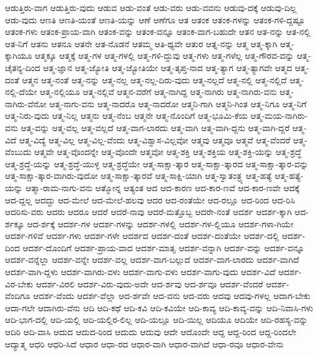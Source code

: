{ಆಡುತ್ತಿರು-ವಾಗ
ಆಡುತ್ತಿರು-ವುದು
ಆಡುವ
ಆಡು-ವಂತೆ
ಆಡು-ವರು
ಆಡು-ವವನು
ಆಡುವು-ದಕ್ಕೆ
ಆಡುವು-ದಿಲ್ಲ
ಆಡು-ವುದು
ಆಣತಿ
ಆಣತಿ-ಯಂತೆ
ಆಣತಿ-ಯನ್ನು
ಆಣೆ
ಆಣೆಗೂ
ಆತ
ಆತಂಕ
ಆತಂಕ-ಗಳನ್ನು
ಆತಂಕ-ಗಳಿ-ದ್ದಷ್ಟೂ
ಆತಂಕ-ಗಳು
ಆತಂಕ-ಪ್ರಾಯ-ವಾಗಿ
ಆತಂಕ-ವನ್ನು
ಆತಂಕ-ವನ್ನೂ
ಆತಂಕ-ವಾಗ-ಬಹುದೇ
ಆತನ
ಆತ-ನನ್ನು
ಆತ-ನಲ್ಲಿ
ಆತ-ನಿಗೆ
ಆತನು
ಆತನೂ
ಆತನೇ
ಆತ-ನೊಡನೆ
ಆತಮ್ಮ
ಆತಿ-ಥ್ಯವೇ
ಆತುರ
ಆತ್ನ-ನನ್ನು
ಆತ್ಮ
ಆತ್ಮ-ಕ್ಕಾಗಿ
ಆತ್ಮ-ಕ್ಕಾಗಿಯೂ
ಆತ್ಮಕ್ಕೂ
ಆತ್ಮಕ್ಕೆ
ಆತ್ಮ-ಗಳ
ಆತ್ಮ-ಗಳಲ್ಲಿ
ಆತ್ಮ-ಗಳಿ-ದ್ದುವು
ಆತ್ಮ-ಗಳು
ಆತ್ಮ-ಗಳೆಲ್ಲ
ಆತ್ಮ-ಗೌರವ-ವನ್ನು
ಆತ್ಮ-ಚೈತನ್ಯ-ದಿಂದ
ಆತ್ಮ-ಜ್ಞಾನ
ಆತ್ಮ-ಜ್ಯೋತಿ
ಆತ್ಮ-ಜ್ಯೋತಿಯೇ
ಆತ್ಮ-ತೃಪ್ತ-ನಾದ
ಆತ್ಮ-ತ್ಯಾಗ
ಆತ್ಮ-ತ್ಯಾಗವೇ
ಆತ್ಮದ
ಆತ್ಮ-ದಂತೆ
ಆತ್ಮನ
ಆತ್ಮ-ನಂತೆ
ಆತ್ಮ-ನನ್ನು
ಆತ್ಮ-ನಲ್ಲ
ಆತ್ಮ-ನಲ್ಲ-ದಿರು-ವುದು
ಆತ್ಮ-ನಲ್ಲದೆ
ಆತ್ಮ-ನಲ್ಲಿ
ಆತ್ಮ-ನಲ್ಲಿದೆ
ಆತ್ಮ-ನಲ್ಲಿ-ದೆಯೇ
ಆತ್ಮ-ನಲ್ಲಿಯೂ
ಆತ್ಮ-ನಲ್ಲಿವೆ
ಆತ್ಮನ-ವರೆಗೆ
ಆತ್ಮ-ನಾಗಿದ್ದ
ಆತ್ಮ-ನಾಗಿರು
ಆತ್ಮ-ನಾಗಿರು-ವನು
ಆತ್ಮ-ನಾಗಿರು-ವೆನೋ
ಆತ್ಮ-ನಾಗು-ವನು
ಆತ್ಮ-ನಾದರೊ
ಆತ್ಮ-ನಾದರೋ
ಆತ್ಮನಿ-ಗಾಗಿ
ಆತ್ಮನಿ-ಗಿಂತ
ಆತ್ಮ-ನಿಗೂ
ಆತ್ಮ-ನಿಗೆ
ಆತ್ಮ-ನಿರು-ವುದು
ಆತ್ಮ-ನಿಲ್ಲ
ಆತ್ಮನು
ಆತ್ಮ-ನೆಂಬ
ಆತ್ಮನೇ
ಆತ್ಮ-ನೊಂದಿಗೆ
ಆತ್ಮ-ಭೂಮಿ-ಕೆಯ
ಆತ್ಮ-ಮಯ-ನಾಗಿರು-ವನು
ಆತ್ಮ-ವನ್ನು
ಆತ್ಮ-ವಲ್ಲ
ಆತ್ಮ-ವಲ್ಲದೆ
ಆತ್ಮ-ವಾಗ-ಲಾರದು
ಆತ್ಮ-ವಾಗಿ
ಆತ್ಮ-ವಾಗಿ-ದ್ದನು
ಆತ್ಮ-ವಾಗಿ-ದ್ದರೆ
ಆತ್ಮ-ವಿದೆ
ಆತ್ಮ-ವಿದ್ಯೆ
ಆತ್ಮ-ವಿಲ್ಲ
ಆತ್ಮ-ವಿಲ್ಲ-ವೆಂದು
ಆತ್ಮ-ವಿಶ್ವಾಸ-ವಿಲ್ಲವೋ
ಆತ್ಮವು
ಆತ್ಮವೂ
ಆತ್ಮವೆ
ಆತ್ಮ-ವೆಂದರೆ
ಆತ್ಮ-ವೆಂಬುದು
ಆತ್ಮವೇ
ಆತ್ಮ-ವೊಂದನ್ನೇ
ಆತ್ಮ-ವೊಂದೇ
ಆತ್ಮವೋ
ಆತ್ಮ-ಶಕ್ತಿ
ಆತ್ಮ-ಶಕ್ತಿಯ
ಆತ್ಮ-ಶಕ್ತಿ-ಯನ್ನು
ಆತ್ಮ-ಶ್ರದ್ಧೆ
ಆತ್ಮ-ಶ್ರದ್ಧೆ-ಯನ್ನು
ಆತ್ಮ-ಶ್ರದ್ಧೆ-ಯುಳ್ಳ
ಆತ್ಮ-ಶ್ರದ್ಧೆಯೇ
ಆತ್ಮ-ಸಾಕ್ಷಾ-ತ್ಕಾರ
ಆತ್ಮ-ಸಾಕ್ಷಾ-ತ್ಕಾರದ
ಆತ್ಮ-ಸಾಕ್ಷಾ-ತ್ಕಾರ-ವನ್ನು
ಆತ್ಮ-ಸಾಕ್ಷಾ-ತ್ಕಾರ-ವಾಗಿರು-ವುದೋ
ಆತ್ಮ-ಸಾಕ್ಷಾ-ತ್ಕಾರವೆ
ಆತ್ಮ-ಸಾಕ್ಷಿ-ಯಾಗಿ
ಆತ್ಮ-ಸ್ವಾತಂತ್ರ್ಯ
ಆತ್ಮ-ಹತ್ಯೆ
ಆತ್ಮ-ಹತ್ಯೆ-ಯನ್ನು
ಆತ್ಮಾ-ರಾಮ-ನಾಗು-ವನು
ಆತ್ಮೋನ್ನ
ಆತ್ಯಂತ
ಆದ
ಆದ-ಕಾರಣ
ಆದ-ಕಾರ-ಣವೆ
ಆದ-ಕಾರ-ಣವೇ
ಆದಕ್ಕೆ
ಆದ-ದ್ದಲ್ಲ
ಆದದ್ದು
ಆದ-ಮೇಲೆ
ಆದ-ಮೇಲೆ-ಹಲವು
ಆದರ
ಆದ-ರಂತೆಯೇ
ಆದ-ರಲ್ಲೂ
ಆದ-ರಿಂದ
ಆದ-ರಿಸಿ
ಆದರಿಸು-ವರು
ಆದರು
ಆದರೂ
ಆದರೆ
ಆದರೆ-ನಾವು
ಆದರೆ-ಮತ್ತೊಬ್ಬ
ಆದರೇ-ನಂತೆ
ಆದರ್ಶ
ಆದರ್ಶ-ಕ್ಕಾಗಿ
ಆದ-ರ್ಶಕ್ಕೂ
ಆದ-ರ್ಶಕ್ಕೆ
ಆದರ್ಶ-ಗಳ
ಆದರ್ಶ-ಗಳನ್ನು
ಆದರ್ಶ-ಗಳಲ್ಲಿ
ಆದರ್ಶ-ಗಳ-ಲ್ಲಿಯೂ
ಆದರ್ಶ-ಗಳಾ-ಗಿಯೇ
ಆದರ್ಶ-ಗಳಿವೆ
ಆದರ್ಶ-ಗಳು
ಆದರ್ಶ-ಗಳೇ
ಆದರ್ಶದ
ಆದರ್ಶ-ದಂತೆ
ಆದರ್ಶ-ದಂತೆಯೇ
ಆದರ್ಶ-ದಲ್ಲಿ
ಆದರ್ಶ-ದಿಂದ
ಆದರ್ಶ-ದೊಂದಿಗೆ
ಆದರ್ಶ-ಪ್ರಾಯ-ವಾದ
ಆದರ್ಶ-ಮಾತೃ
ಆದರ್ಶ-ವನ್ನಾಗಿ
ಆದರ್ಶ-ವನ್ನು
ಆದರ್ಶ-ವನ್ನೂ
ಆದರ್ಶ-ವನ್ನೆಲ್ಲಾ
ಆದರ್ಶ-ವನ್ನೇ
ಆದರ್ಶ-ವಲ್ಲ
ಆದರ್ಶ-ವಾಗ-ಬಲ್ಲುದೆ
ಆದರ್ಶ-ವಾಗ-ಲಾರದು
ಆದರ್ಶ-ವಾಗಿದೆ
ಆದರ್ಶ-ವಾಗಿ-ದ್ದಳು
ಆದರ್ಶ-ವಾಗಿರು-ವಳು
ಆದರ್ಶ-ವಾಗು-ವಳು
ಆದರ್ಶ-ವಾಗು-ವುದು
ಆದರ್ಶ-ವಿದೆ
ಆದರ್ಶ-ವಿರ-ಬೇಕು
ಆದರ್ಶ-ವಿರಲಿ
ಆದರ್ಶ-ವಿರು-ವುದು-ಅದೇ
ಆದ-ರ್ಶವು
ಆದ-ರ್ಶವೂ
ಆದರ್ಶ-ವೆಂದರೆ
ಆದರ್ಶ-ವೆಂದಿಗೂ
ಆದರ್ಶ-ವೆಂದು
ಆದರ್ಶ-ವೆಲ್ಲಾ
ಆದ-ರ್ಶವೇ
ಆದ-ವನು
ಆದ-ವರು
ಆದವು
ಆದವು-ಗಳಲ್ಲ
ಆದಾಗ-ಬೇಕು
ಆದಾ-ಗಲೇ
ಆದಾಗಿರು-ವೆನು
ಆದಿ
ಆದಿ-ಕಥೆ
ಆದಿ-ಕವಿ
ಆದಿ-ಕವಿಯೇ
ಆದಿ-ಕಾವ್ಯ
ಆದಿ-ಕಾವ್ಯ-ವನ್ನು
ಆದಿ-ನಿವಾಸಿ-ಗಳು
ಆದಿ-ಭಾಗ-ದಲ್ಲಿ
ಆದಿ-ಯಲ್ಲಿ
ಆದಿ-ಯಲ್ಲಿರ-ಲಿಲ್ಲ
ಆದಿ-ಯಲ್ಲೂ
ಆದಿ-ಯಿಲ್ಲ
ಆದಿಯೂ
ಆದಿಯೇ
ಆದಿ-ರಹಸ್ಯ-ವನ್ನು
ಆದಿರಿ
ಆದಿ-ವಾಸಿ
ಆದುದ
ಆದುದ-ರಿಂದ
ಆದುದು
ಆದುವು
ಆದೇ
ಆದೊಂದೇ
ಆದ್ದ
ಆದ್ದ-ರಿಂದ
ಆದ್ದ-ರಿಂದಲೇ
ಆದ್ಯಾತ್ಮ
ಆಧರಿ
ಆಧರಿ-ಸಿದೆ
ಆಧಾರ
ಆಧಾ-ರದ
ಆಧಾರ-ವಾಗಿ
ಆಧಾರ-ವಾಗಿದೆ
ಆಧಾ-ರವೂ
ಆಧಾರ-ವೇನು
}
